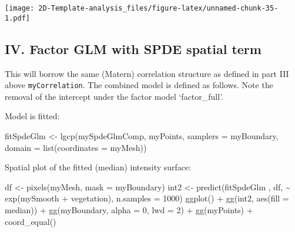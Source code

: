 \documentclass[
]{article}
\newenvironment{Shaded}{\begin{snugshade}}{\end{snugshade}}
\newcommand{\AttributeTok}[1]{\textcolor[rgb]{0.77,0.63,0.00}{#1}}
\newcommand{\DecValTok}[1]{\textcolor[rgb]{0.00,0.00,0.81}{#1}}
\newcommand{\FunctionTok}[1]{\textcolor[rgb]{0.00,0.00,0.00}{#1}}
\newcommand{\NormalTok}[1]{#1}
\newcommand{\OtherTok}[1]{\textcolor[rgb]{0.56,0.35,0.01}{#1}}
\newcommand{\SpecialCharTok}[1]{\textcolor[rgb]{0.00,0.00,0.00}{#1}}
\newcommand{\StringTok}[1]{\textcolor[rgb]{0.31,0.60,0.02}{#1}}
\begin{document}
\texttt{[image: 2D-Template-analysis\_files/figure-latex/unnamed-chunk-35-1.pdf]}

\hypertarget{iv.-factor-glm-with-spde-spatial-term}{%
\subsection{IV. Factor GLM with SPDE spatial
term}\label{iv.-factor-glm-with-spde-spatial-term}}

This will borrow the same (Matern) correlation structure as defined in
part III above \texttt{myCorrelation}. The combined model is defined as
follows. Note the removal of the intercept under the factor model
`factor\_full'.

\begin{Shaded}
\end{Shaded}

Model is fitted:

\begin{Shaded}
\begin{Highlighting}[]
\NormalTok{fitSpdeGlm }\OtherTok{\textless{}{-}} \FunctionTok{lgcp}\NormalTok{(mySpdeGlmComp, myPoints, }\AttributeTok{samplers =}\NormalTok{ myBoundary, }\AttributeTok{domain =} \FunctionTok{list}\NormalTok{(}\AttributeTok{coordinates =}\NormalTok{ myMesh))}
\end{Highlighting}
\end{Shaded}

Spatial plot of the fitted (median) intensity surface:

\begin{Shaded}
\begin{Highlighting}[]
\NormalTok{df }\OtherTok{\textless{}{-}} \FunctionTok{pixels}\NormalTok{(myMesh, }\AttributeTok{mask =}\NormalTok{ myBoundary)}
\NormalTok{int2 }\OtherTok{\textless{}{-}} \FunctionTok{predict}\NormalTok{(fitSpdeGlm , df, }\SpecialCharTok{\textasciitilde{}} \FunctionTok{exp}\NormalTok{(mySmooth }\SpecialCharTok{+}\NormalTok{ vegetation), }\AttributeTok{n.samples =} \DecValTok{1000}\NormalTok{)}
\FunctionTok{ggplot}\NormalTok{() }\SpecialCharTok{+}
  \FunctionTok{gg}\NormalTok{(int2, }\FunctionTok{aes}\NormalTok{(}\AttributeTok{fill =}\NormalTok{ median)) }\SpecialCharTok{+}
  \FunctionTok{gg}\NormalTok{(myBoundary, }\AttributeTok{alpha =} \DecValTok{0}\NormalTok{, }\AttributeTok{lwd =} \DecValTok{2}\NormalTok{) }\SpecialCharTok{+}
  \FunctionTok{gg}\NormalTok{(myPoints) }\SpecialCharTok{+}
  \FunctionTok{coord\_equal}\NormalTok{()}
\end{Highlighting}
\end{Shaded}
\end{document}

